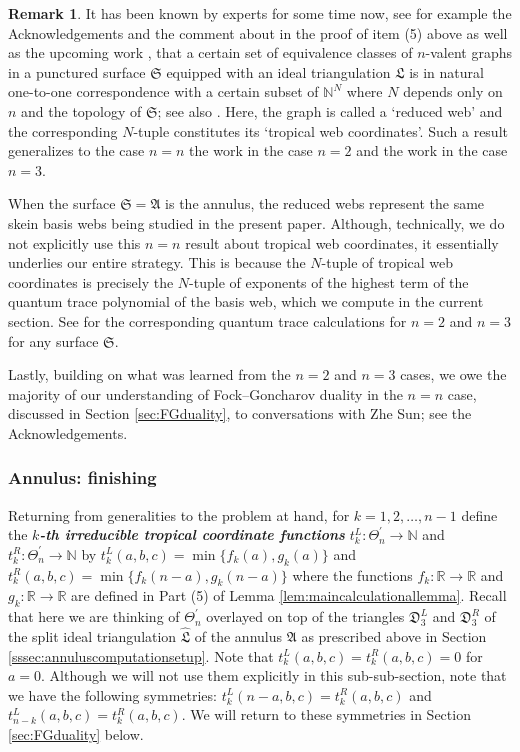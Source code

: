 \documentclass[12pt,
	]{amsart}
\theoremstyle{definition}
\newtheorem{remark}[theorem]{Remark}
\renewcommand{\hat}{\widehat}
\newcommand{\mbb}[1]{\mathbb{#1}}
\newcommand{\mfrak}[1]{\mathfrak{#1}}
\newcommand{\define}[1]{{\textit{\textbf{#1}}}}
\newcommand{\nnegZ}{\mbb{N}}
\newcommand{\R}{\mbb{R}}
\newcommand{\ann}{\mfrak{A}}
\newcommand{\surf}{\mfrak{S}}
\newcommand{\ttriang}{\mfrak{D}_3}
\newcommand{\idealtriang}{\mfrak{L}}
\newcommand{\splitidealtriang}{\hat{\idealtriang}}
\newcommand{\discrete}{\Theta_n}
\newcommand{\cornerlessdiscrete}{\discrete^\prime}
\begin{document}
\begin{remark}
It has been known by experts for some time now, see for example the Acknowledgements and the comment about \cite{SunGeomFunctAnal20} in the proof of item (5) above as well as the upcoming work \cite{leshensunweng}, that a certain set of equivalence classes of $n$-valent graphs in a punctured surface $\surf$ equipped with an ideal triangulation $\idealtriang$ is in natural one-to-one correspondence with a certain subset of $\nnegZ^N$ where $N$ depends only on $n$ and the topology of $\surf$; see also \cite{xie2013higherlaminationswebsn2}.  Here, the graph is called a `reduced web' and the corresponding $N$-tuple constitutes its `tropical web coordinates'.  Such a result generalizes to the case $n=n$ the work \cite{FockArxiv97, fockMR2233852} in the case $n=2$ and the work \cite{douglasMR4685684, douglas2022tropical, Frohman22MathZ} in the case $n=3$.  

When the surface $\surf=\ann$ is the annulus, the reduced webs represent the same skein basis webs being studied in the present paper.  Although, technically, we do not explicitly use this $n=n$ result about tropical web coordinates, it essentially underlies our entire strategy.  This is because the $N$-tuple of tropical web coordinates is precisely the $N$-tuple of exponents of the highest term of the quantum trace polynomial of the basis web, which we compute in the current section.  See \cite{bonahonMR2851072, kim2022rm} for the corresponding quantum trace calculations for $n=2$ and $n=3$ for any surface $\surf$.  

Lastly, building on what was learned from the $n=2$ and $n=3$ cases, we owe the majority of our understanding of Fock--Goncharov duality in the $n=n$ case, discussed in Section \ref{sec:FGduality}, to conversations with Zhe Sun; see the Acknowledgements.
\end{remark}

\subsubsection{Annulus:  finishing}\label{sssec:annuluscomputationfinishing}
Returning from generalities to the problem at hand, for $k=1,2,\dots,n-1$ define the \define{$k$-th irreducible tropical coordinate functions} $t^L_k:\cornerlessdiscrete\to\nnegZ$ and $t^R_k:\cornerlessdiscrete\to\nnegZ$ by $t^L_k(a,b,c)=\min\{f_k(a),g_k(a)\}$ and $t^R_k(a,b,c)=\min\{f_k(n-a),g_k(n-a)\}$ where the functions $f_k:\R\to\R$ and $g_k:\R\to\R$ are defined in Part (5) of Lemma \ref{lem:maincalculationallemma}.  Recall that here we are thinking of $\cornerlessdiscrete$ overlayed on top of the triangles $\ttriang^L$ and $\ttriang^R$ of the split ideal triangulation $\splitidealtriang$ of the annulus $\ann$ as prescribed above in Section \ref{sssec:annuluscomputationsetup}.  Note that $t^L_k(a,b,c)=t^R_k(a,b,c)=0$ for $a=0$.  Although we will not use them explicitly in this sub-sub-section, note that we have the following symmetries:  $t^L_k(n-a,b,c)=t^R_k(a,b,c)$ and $t^L_{n-k}(a,b,c)=t^R_k(a,b,c)$.  We will return to these symmetries in Section \ref{sec:FGduality} below.  
\end{document}
